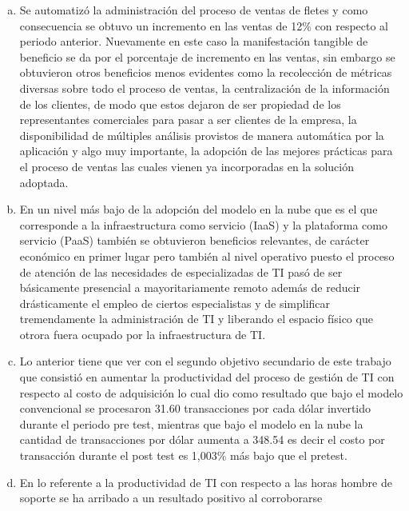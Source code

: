 \begin{enumerate}[a.]
          de la empresa.
    \item Se automatiz\'o la administraci\'on del proceso de ventas de fletes y
          como consecuencia se obtuvo un incremento en las ventas de 12\% con
          respecto al periodo anterior. Nuevamente en este caso la manifestaci\'on
          tangible de beneficio se da por el porcentaje de incremento en las ventas,
          sin embargo se obtuvieron otros beneficios menos evidentes como la
          recolecci\'on de m\'etricas diversas sobre todo el proceso de ventas,
          la centralizaci\'on de la informaci\'on de los clientes, de modo que
          estos dejaron de ser propiedad de los representantes comerciales para
          pasar a ser clientes de la empresa, la disponibilidad de m\'ultiples
          an\'alisis provistos de manera autom\'atica por la aplicaci\'on y algo
          muy importante, la adopci\'on de las mejores pr\'acticas para el proceso
          de ventas las cuales vienen ya incorporadas en la soluci\'on adoptada.
    \item En un nivel m\'as bajo de la adopci\'on del modelo en la nube que es
          el que corresponde a la infraestructura como servicio (IaaS) y la
          plataforma como servicio (PaaS) tambi\'en se obtuvieron beneficios
          relevantes, de car\'acter econ\'omico en primer lugar pero tambi\'en
          al nivel operativo puesto el proceso de atenci\'on de las necesidades
          de especializadas de TI pas\'o de ser b\'asicamente presencial a
          mayoritariamente remoto adem\'as de reducir dr\'asticamente el empleo
          de ciertos especialistas y de simplificar tremendamente la administraci\'on
          de TI y liberando el espacio f\'isico que otrora fuera ocupado por la
          infraestructura de TI.
    \item Lo anterior tiene que ver con el segundo objetivo secundario de este
          trabajo que consisti\'o en aumentar la productividad del proceso de
          gesti\'on de TI con respecto al costo de adquisici\'on lo cual dio como
          resultado que bajo el modelo convencional se procesaron 31.60 transacciones
          por cada d\'olar invertido durante el periodo pre test, mientras que
          bajo el modelo en la nube la cantidad de transacciones por d\'olar
          aumenta a 348.54 es decir el costo por transacci\'on durante el post
          test es 1,003\% m\'as bajo que el pretest.
    \item En lo referente a la productividad de TI con respecto a las horas
          hombre de soporte se ha arribado a un resultado positivo al corroborarse

\end{enumerate}
